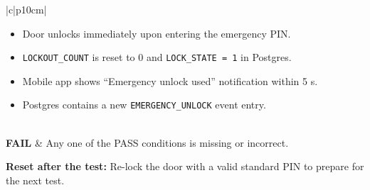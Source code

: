 \begin{samepage}
\begin{center}
\begin{tabular}{|c|p{10cm}|}
\begin{minipage}[t]{\linewidth}
\begin{itemize}
          \item Door unlocks immediately upon entering the emergency PIN.
          \item \texttt{LOCKOUT\_COUNT} is reset to 0 and \texttt{LOCK\_STATE = 1} in Postgres.
          \item Mobile app shows “Emergency unlock used” notification within 5 s.
          \item Postgres contains a new \texttt{EMERGENCY\_UNLOCK} event entry. \\
        \end{itemize}
        \end{minipage} \\
      \hline
      \textbf{FAIL} & Any one of the PASS conditions is missing or incorrect. \\
      \hline
    \end{tabular}
    \end{center}
    
    \vspace{0.5em}
    
    \noindent\textbf{Reset after the test:}  
    Re-lock the door with a valid standard PIN to prepare for the next test.\\
    
\end{samepage}



